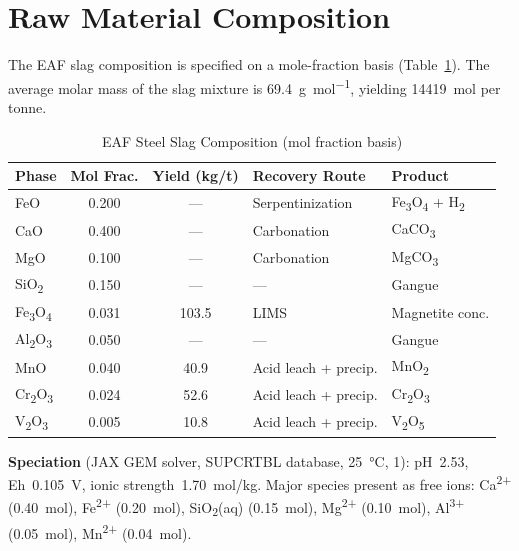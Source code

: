 \documentclass[11pt,a4paper]{article}
\begin{document}
\section{Raw Material Composition}

The EAF slag composition is specified on a mole-fraction basis (Table~\ref{tab:feed}).
The average molar mass of the slag mixture is \SI{69.4}{\gram\per\mol},
yielding \SI{14419}{\mol} per tonne.

\begin{table}[H]
\centering
\caption{EAF Steel Slag Composition (mol fraction basis)}
\label{tab:feed}
\begin{tabular}{@{}lccll@{}}
\toprule
\textbf{Phase} & \textbf{Mol Frac.} & \textbf{Yield (kg/t)} & \textbf{Recovery Route} & \textbf{Product} \\
\midrule
FeO            & 0.200 & ---   & Serpentinization         & Fe\textsubscript{3}O\textsubscript{4} + H\textsubscript{2} \\
CaO            & 0.400 & ---   & Carbonation              & CaCO\textsubscript{3} \\
MgO            & 0.100 & ---   & Carbonation              & MgCO\textsubscript{3} \\
SiO\textsubscript{2} & 0.150 & --- & ---               & Gangue \\
Fe\textsubscript{3}O\textsubscript{4} & 0.031 & 103.5 & LIMS             & Magnetite conc. \\
Al\textsubscript{2}O\textsubscript{3} & 0.050 & --- & ---               & Gangue \\
MnO            & 0.040 & 40.9  & Acid leach + precip.     & MnO\textsubscript{2} \\
Cr\textsubscript{2}O\textsubscript{3} & 0.024 & 52.6 & Acid leach + precip.  & Cr\textsubscript{2}O\textsubscript{3} \\
V\textsubscript{2}O\textsubscript{3} & 0.005 & 10.8 & Acid leach + precip.   & V\textsubscript{2}O\textsubscript{5} \\
\bottomrule
\end{tabular}
\end{table}

\noindent\textbf{Speciation} (JAX GEM solver, SUPCRTBL database, \SI{25}{\degreeCelsius},
\SI{1}{\atm}): pH~2.53, Eh~\SI{0.105}{V}, ionic strength~\SI{1.70}{mol/kg}.
Major species present as free ions: Ca\textsuperscript{2+} (\SI{0.40}{mol}),
Fe\textsuperscript{2+} (\SI{0.20}{mol}), SiO\textsubscript{2}(aq)
(\SI{0.15}{mol}), Mg\textsuperscript{2+} (\SI{0.10}{mol}),
Al\textsuperscript{3+} (\SI{0.05}{mol}), Mn\textsuperscript{2+} (\SI{0.04}{mol}).
\end{document}
